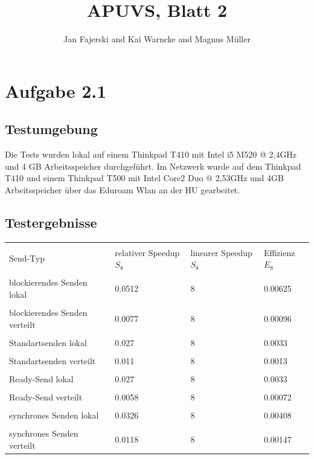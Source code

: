\documentclass[a4paper,
12pt,
BCOR12mm,
]{scrartcl}
\title{APUVS, Blatt 2}
\author{Jan Fajerski and Kai Warncke and Magnus Müller}
\begin{document}
\maketitle  

\section*{Aufgabe 2.1}
  \subsection*{Testumgebung}
    Die Tests wurden lokal auf einem Thinkpad T410 mit Intel i5 M520 @ 2,4GHz und 4 GB Arbeitsspeicher durchgeführt.
    Im Netzwerk wurde auf dem Thinkpad T410 und einem Thinkpad T500 mit Intel Core2 Duo @ 2,53GHz und 4GB Arbeitsspeicher über das Eduroam Wlan
    an der HU gearbeitet.
  \subsection*{Testergebnisse}
{\scriptsize
\begin{tabular}[10pt]{|p{3cm}|p{3cm}|p{3cm}|p{3cm}|}
      \hline &&&\\
      Send-Typ                      & relativer Speedup $S_8$       & linearer Speedup  $S_8$       & Effizienz $E_8$   \\
      \hline &&&\\
      blockierendes Senden lokal    & 0.0512                        & 8                             & 0.00625           \\
      \hline &&&\\
      blockierendes Senden verteilt & 0.0077                        & 8                             & 0.00096           \\
      \hline &&&\\
      Standartsenden lokal          & 0.027                         & 8                             & 0.0033            \\
      \hline &&&\\
      Standartsenden verteilt       & 0.011                         & 8                             & 0.0013            \\
      \hline &&&\\
      Ready-Send lokal              & 0.027                         & 8                             & 0.0033            \\
      \hline &&&\\
      Ready-Send verteilt           & 0.0058                        & 8                             & 0.00072           \\
      \hline &&&\\
      synchrones Senden lokal       & 0.0326                        & 8                             & 0.00408           \\
      \hline &&&\\
      synchrones Senden verteilt    & 0.0118                        & 8                             & 0.00147           \\
      \hline 
    \end{tabular}}
\end{document}
